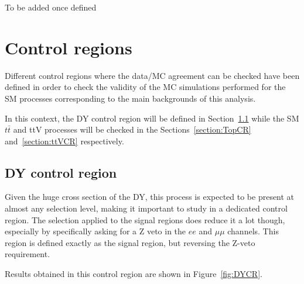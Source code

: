 \documentclass[a4paper, 10pt, openright]{report}
\begin{document}
\color{red}To be added once defined \color{black}

\section{Control regions} \label{section:CR}

Different control regions where the data/\ac{MC} agreement can be checked have been defined in order to check the validity of the \ac{MC} simulations performed for the \ac{SM} processes corresponding to the main backgrounds of this analysis. 

In this context, the \ac{DY} control region will be defined in Section~\ref{section:DYCR} while the \ac{SM} $t \bar t$ and ttV processes will be checked in the Sections~\ref{section:TopCR} and~\ref{section:ttVCR} respectively.

\subsection{\acs{DY} control region} \label{section:DYCR}

Given the huge cross section of the \ac{DY}, this process is expected to be present at almost any selection level, making it important to study in a dedicated control region. The selection applied to the signal regions does reduce it a lot though, especially by specifically asking for a Z veto in the $ee$ and $\mu \mu$ channels. This region is defined exactly as the signal region, but reversing the Z-veto requirement.

Results obtained in this control region are shown in Figure~\ref{fig:DYCR}.
\end{document}
